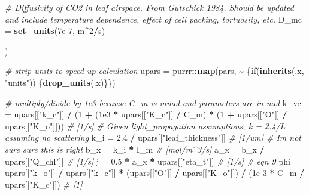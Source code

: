 \documentclass[12pt,halfline,a4paper,]{ouparticle}
\newenvironment{Shaded}{\begin{snugshade}}{\end{snugshade}}
\newcommand{\AttributeTok}[1]{\textcolor[rgb]{0.13,0.29,0.53}{#1}}
\newcommand{\CommentTok}[1]{\textcolor[rgb]{0.56,0.35,0.01}{\textit{#1}}}
\newcommand{\ControlFlowTok}[1]{\textcolor[rgb]{0.13,0.29,0.53}{\textbf{#1}}}
\newcommand{\DecValTok}[1]{\textcolor[rgb]{0.00,0.00,0.81}{#1}}
\newcommand{\FloatTok}[1]{\textcolor[rgb]{0.00,0.00,0.81}{#1}}
\newcommand{\FunctionTok}[1]{\textcolor[rgb]{0.13,0.29,0.53}{\textbf{#1}}}
\newcommand{\NormalTok}[1]{#1}
\newcommand{\OtherTok}[1]{\textcolor[rgb]{0.56,0.35,0.01}{#1}}
\newcommand{\SpecialCharTok}[1]{\textcolor[rgb]{0.81,0.36,0.00}{\textbf{#1}}}
\newcommand{\StringTok}[1]{\textcolor[rgb]{0.31,0.60,0.02}{#1}}
\begin{document}
\begin{Shaded}
\begin{Highlighting}[]
    \CommentTok{\# Diffusivity of CO2 in leaf airspace. From Gutschick 1984. Should be updated and include temperature dependence, effect of cell packing, tortuosity, etc.}
    \AttributeTok{D\_mc =} \FunctionTok{set\_units}\NormalTok{(}\FloatTok{7e{-}7}\NormalTok{, m}\SpecialCharTok{\^{}}\DecValTok{2}\SpecialCharTok{/}\NormalTok{s)}

\NormalTok{)}

\CommentTok{\# strip units to speed up calculation}
\NormalTok{upars }\OtherTok{=}\NormalTok{ purrr}\SpecialCharTok{::}\FunctionTok{map}\NormalTok{(pars, }\SpecialCharTok{\textasciitilde{}}\NormalTok{ \{}\ControlFlowTok{if}\NormalTok{(}\FunctionTok{inherits}\NormalTok{(.x, }\StringTok{"units"}\NormalTok{)) \{}\FunctionTok{drop\_units}\NormalTok{(.x)\}\})}

\CommentTok{\# multiply/divide by 1e3 because C\_m is mmol and parameters are in mol}
\NormalTok{k\_vc }\OtherTok{=}\NormalTok{ upars[[}\StringTok{"k\_c"}\NormalTok{]] }\SpecialCharTok{/}\NormalTok{ (}\DecValTok{1} \SpecialCharTok{+}\NormalTok{ (}\FloatTok{1e3} \SpecialCharTok{*}\NormalTok{ upars[[}\StringTok{"K\_c"}\NormalTok{]] }\SpecialCharTok{/}\NormalTok{ C\_m) }\SpecialCharTok{*}
\NormalTok{                           (}\DecValTok{1} \SpecialCharTok{+}\NormalTok{ upars[[}\StringTok{"O"}\NormalTok{]] }\SpecialCharTok{/}\NormalTok{ upars[[}\StringTok{"K\_o"}\NormalTok{]])) }\CommentTok{\# [1/s]}
\CommentTok{\# Given light\_propagation assumptions, k = 2.4/L assuming no scattering}
\NormalTok{k\_i }\OtherTok{=} \FloatTok{2.4} \SpecialCharTok{/}\NormalTok{ upars[[}\StringTok{"leaf\_thickness"}\NormalTok{]] }\CommentTok{\# [1/um] \# I\textquotesingle{}m not sure sure this is right}
\NormalTok{b\_x }\OtherTok{=}\NormalTok{ k\_i }\SpecialCharTok{*}\NormalTok{ I\_m }\CommentTok{\# [mol/m\^{}3/s]}
\NormalTok{a\_x }\OtherTok{=}\NormalTok{ b\_x }\SpecialCharTok{/}\NormalTok{ upars[[}\StringTok{"Q\_chl"}\NormalTok{]] }\CommentTok{\# [1/s]}
\NormalTok{j }\OtherTok{=} \FloatTok{0.5} \SpecialCharTok{*}\NormalTok{ a\_x }\SpecialCharTok{*}\NormalTok{ upars[[}\StringTok{"eta\_t"}\NormalTok{]] }\CommentTok{\# [1/s] \# eqn 9}
\NormalTok{phi }\OtherTok{=}\NormalTok{ upars[[}\StringTok{"k\_o"}\NormalTok{]] }\SpecialCharTok{/}\NormalTok{ upars[[}\StringTok{"k\_c"}\NormalTok{]] }\SpecialCharTok{*}\NormalTok{ (upars[[}\StringTok{"O"}\NormalTok{]] }\SpecialCharTok{/}\NormalTok{ upars[[}\StringTok{"K\_o"}\NormalTok{]]) }\SpecialCharTok{/}
\NormalTok{  (}\FloatTok{1e{-}3} \SpecialCharTok{*}\NormalTok{ C\_m }\SpecialCharTok{/}\NormalTok{ upars[[}\StringTok{"K\_c"}\NormalTok{]]) }\CommentTok{\# [1]}

\end{Highlighting}
\end{Shaded}
\end{document}
